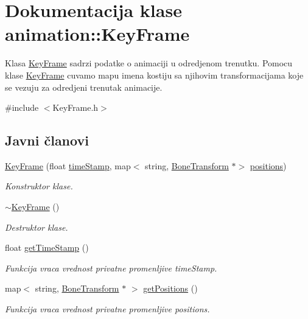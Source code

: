 \hypertarget{classanimation_1_1KeyFrame}{}\section{Dokumentacija klase animation\+:\+:Key\+Frame}
\label{classanimation_1_1KeyFrame}


Klasa \hyperlink{classanimation_1_1KeyFrame}{Key\+Frame} sadrzi podatke o animaciji u odredjenom trenutku. Pomocu klase \hyperlink{classanimation_1_1KeyFrame}{Key\+Frame} cuvamo mapu imena kostiju sa njihovim transformacijama koje se vezuju za odredjeni trenutak animacije.  




{\ttfamily \#include $<$Key\+Frame.\+h$>$}

\subsection*{Javni članovi}
\begin{DoxyCompactItemize}
\item 
\hyperlink{classanimation_1_1KeyFrame_ad294322ab993c5d93d3447cf10be0005}{Key\+Frame} (float \hyperlink{classanimation_1_1KeyFrame_ab8aa2370d72822b00f0528c69b9a5932}{time\+Stamp}, map$<$ string, \hyperlink{classanimation_1_1BoneTransform}{Bone\+Transform} $\ast$$>$ \hyperlink{classanimation_1_1KeyFrame_a8e01baabf041ee027a0166670ad30e96}{positions})
\begin{DoxyCompactList}\small\item\em Konstruktor klase. \end{DoxyCompactList}\item 
\hyperlink{classanimation_1_1KeyFrame_adf0e5cec6ec1d5d91d8fd68b1b523c12}{$\sim$\+Key\+Frame} ()
\begin{DoxyCompactList}\small\item\em Destruktor klase. \end{DoxyCompactList}\item 
float \hyperlink{classanimation_1_1KeyFrame_ae4add751eb799ded63d21388c513402b}{get\+Time\+Stamp} ()
\begin{DoxyCompactList}\small\item\em Funkcija vraca vrednost privatne promenljive time\+Stamp. \end{DoxyCompactList}\item 
map$<$ string, \hyperlink{classanimation_1_1BoneTransform}{Bone\+Transform} $\ast$ $>$ \hyperlink{classanimation_1_1KeyFrame_a0836ea59aee5e8ba67a683d40798f143}{get\+Positions} ()
\begin{DoxyCompactList}\small\item\em Funkcija vraca vrednost privatne promenljive positions. \end{DoxyCompactList}\end{DoxyCompactItemize}
